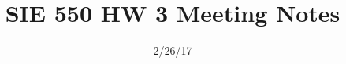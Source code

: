 \documentclass[12pt]{article}
\begin{document}
\title{SIE 550 HW 3 Meeting Notes}
\date{2/26/17}

\maketitle
\end{document}
